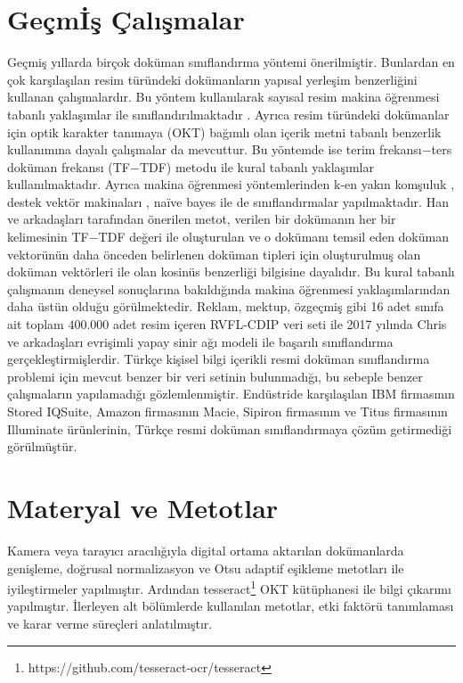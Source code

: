 \documentclass[conference, a4paper]{IEEEtran}
\begin{document}
\section{Geçm{\footnotesize İ}ş Çalışmalar}
\label{sec:gecmis}
Geçmiş yıllarda birçok doküman sınıflandırma yöntemi önerilmiştir. Bunlardan en çok karşılaşılan resim türündeki
dokümanların yapısal yerleşim benzerliğini kullanan çalışmalardır. Bu yöntem kullanılarak sayısal resim makina
öğrenmesi tabanlı yaklaşımlar ile sınıflandırılmaktadır \cite{trstenjak2014knn, jones2004idf, csahin2017turkish}.
Ayrıca resim türündeki dokümanlar için optik karakter tanımaya (OKT) bağımlı olan içerik metni tabanlı benzerlik
kullanımına dayalı çalışmalar da mevcuttur. Bu yöntemde ise terim frekansı$-$ters doküman frekansı (TF$-$TDF) metodu
ile kural tabanlı \cite{han2000centroid} yaklaşımlar kullanılmaktadır. Ayrıca makina öğrenmesi yöntemlerinden k-en
yakın komşuluk \cite{trstenjak2014knn}, destek vektör makinaları \cite{csahin2017turkish}, na\"ive bayes
\cite{yoo2015classification} ile de sınıflandırmalar yapılmaktadır. Han ve arkadaşları \cite{han2000centroid}
tarafından önerilen metot, verilen bir dokümanın her bir kelimesinin TF$-$TDF değeri ile oluşturulan ve o dokümanı
temsil eden  doküman vektorünün daha önceden belirlenen doküman tipleri için oluşturulmuş olan doküman vektörleri ile
olan kosinüs benzerliği bilgisine dayalıdır. Bu kural tabanlı çalışmanın deneysel sonuçlarına bakıldığında makina
öğrenmesi yaklaşımlarından daha üstün olduğu görülmektedir. Reklam, mektup, özgeçmiş gibi 16 adet sınıfa ait toplam
$400.000$ adet resim içeren RVFL-CDIP \cite{harley2015evaluation} veri seti ile 2017 yılında Chris ve arkadaşları
\cite{kang2014convolutional} evrişimli yapay sinir ağı modeli ile başarılı sınıflandırma gerçekleştirmişlerdir. Türkçe
kişisel bilgi içerikli resmi doküman sınıflandırma problemi için mevcut benzer bir veri setinin bulunmadığı, bu sebeple
benzer çalışmaların yapılamadığı gözlemlenmiştir. Endüstride karşılaşılan IBM firmasının Stored IQSuite, Amazon
firmasının Macie, Sipiron firmasının ve Titus firmasının Illuminate ürünlerinin, Türkçe resmi doküman sınıflandırmaya
çözüm getirmediği görülmüştür.

\section{Materyal ve Metotlar}
\label{sec:materyal}
Kamera veya tarayıcı aracılığıyla digital ortama aktarılan dokümanlarda genişleme, doğrusal normalizasyon ve Otsu
adaptif eşikleme \cite{otsu1979threshold} metotları ile iyileştirmeler yapılmıştır. Ardından
tesseract\footnote{https://github.com/tesseract-ocr/tesseract} OKT kütüphanesi ile bilgi çıkarımı yapılmıştır.
İlerleyen alt bölümlerde kullanılan metotlar, etki faktörü tanımlaması ve karar verme süreçleri anlatılmıştır.
\end{document}
